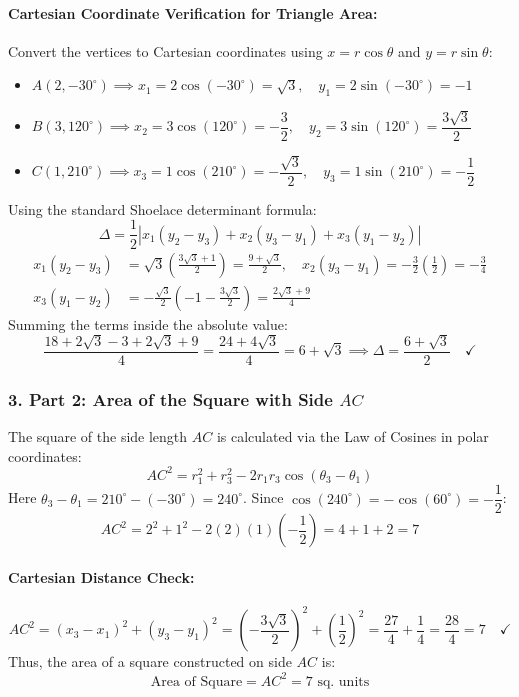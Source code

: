 \documentclass[11pt,a4paper]{article}
\begin{document}
\paragraph{Cartesian Coordinate Verification for Triangle Area:}
Convert the vertices to Cartesian coordinates using $x = r\cos\theta$ and $y = r\sin\theta$:
\begin{itemize}\setlength{\itemsep}{1.5pt}
    \item $A(2, -30^\circ) \implies x_1 = 2\cos(-30^\circ) = \sqrt{3}, \quad y_1 = 2\sin(-30^\circ) = -1$
    \item $B(3, 120^\circ) \implies x_2 = 3\cos(120^\circ) = -\dfrac{3}{2}, \quad y_2 = 3\sin(120^\circ) = \dfrac{3\sqrt{3}}{2}$
    \item $C(1, 210^\circ) \implies x_3 = 1\cos(210^\circ) = -\dfrac{\sqrt{3}}{2}, \quad y_3 = 1\sin(210^\circ) = -\dfrac{1}{2}$
\end{itemize}
Using the standard Shoelace determinant formula:
\[
\Delta = \frac{1}{2}\left| x_1(y_2 - y_3) + x_2(y_3 - y_1) + x_3(y_1 - y_2) \right|
\]
\begin{align*}
x_1(y_2 - y_3) &= \sqrt{3}\left(\frac{3\sqrt{3} + 1}{2}\right) = \frac{9 + \sqrt{3}}{2}, \quad
x_2(y_3 - y_1) = -\frac{3}{2}\left(\frac{1}{2}\right) = -\frac{3}{4} \\
x_3(y_1 - y_2) &= -\frac{\sqrt{3}}{2}\left(-1 - \frac{3\sqrt{3}}{2}\right) = \frac{2\sqrt{3} + 9}{4}
\end{align*}
Summing the terms inside the absolute value:
\[
\frac{18 + 2\sqrt{3} - 3 + 2\sqrt{3} + 9}{4} = \frac{24 + 4\sqrt{3}}{4} = 6 + \sqrt{3} \implies \Delta = \frac{6 + \sqrt{3}}{2} \quad \checkmark
\]

\subsubsection*{3. Part 2: Area of the Square with Side $AC$}
The square of the side length $AC$ is calculated via the Law of Cosines in polar coordinates:
\[
AC^2 = r_1^2 + r_3^2 - 2 r_1 r_3 \cos(\theta_3 - \theta_1)
\]
Here $\theta_3 - \theta_1 = 210^\circ - (-30^\circ) = 240^\circ$. Since $\cos(240^\circ) = -\cos(60^\circ) = -\dfrac{1}{2}$:
\[
AC^2 = 2^2 + 1^2 - 2(2)(1)\left(-\frac{1}{2}\right) = 4 + 1 + 2 = 7
\]
\paragraph{Cartesian Distance Check:}
\[
AC^2 = (x_3 - x_1)^2 + (y_3 - y_1)^2 = \left(-\frac{3\sqrt{3}}{2}\right)^2 + \left(\frac{1}{2}\right)^2 = \frac{27}{4} + \frac{1}{4} = \frac{28}{4} = 7 \quad \checkmark
\]
Thus, the area of a square constructed on side $AC$ is:
\[
\text{Area of Square} = AC^2 = 7\text{ sq. units}
\]
\end{document}
